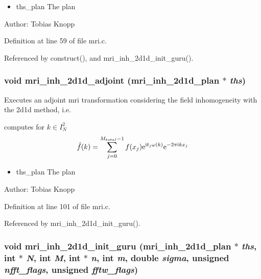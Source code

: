 \begin{itemize}
\item ths\_\-plan The plan\end{itemize}
\begin{Desc}
\item[Author:]Tobias Knopp \end{Desc}


Definition at line 59 of file mri.c.

Referenced by construct(), and mri\_\-inh\_\-2d1d\_\-init\_\-guru().\hypertarget{group__mri_ge431fe3e0ef4dc056f58d827f804d0a4}{
\subsubsection{\setlength{\rightskip}{0pt plus 5cm}void mri\_\-inh\_\-2d1d\_\-adjoint ({\bf mri\_\-inh\_\-2d1d\_\-plan} $\ast$ {\em ths})}}
\label{group__mri_ge431fe3e0ef4dc056f58d827f804d0a4}


Executes an adjoint mri transformation considering the field inhomogeneity with the 2d1d method, i.e. 

computes for $k \in I_N^2$ \[ \hat{f}(k) = \sum_{j=0}^{M_{total}-1} f(x_j) {\rm e}^{\mbox{\rm\scriptsize i} t_j \omega(k)} {\rm e}^{-2 \pi \mbox{\rm\scriptsize i} k x_j} \]

\begin{itemize}
\item ths\_\-plan The plan\end{itemize}
\begin{Desc}
\item[Author:]Tobias Knopp \end{Desc}


Definition at line 101 of file mri.c.

Referenced by mri\_\-inh\_\-2d1d\_\-init\_\-guru().\hypertarget{group__mri_g8010f0f3bd86f3bd6516751b876e6b14}{
\subsubsection{\setlength{\rightskip}{0pt plus 5cm}void mri\_\-inh\_\-2d1d\_\-init\_\-guru ({\bf mri\_\-inh\_\-2d1d\_\-plan} $\ast$ {\em ths}, int $\ast$ {\em N}, int {\em M}, int $\ast$ {\em n}, int {\em m}, double {\em sigma}, unsigned {\em nfft\_\-flags}, unsigned {\em fftw\_\-flags})}}
\label{group__mri_g8010f0f3bd86f3bd6516751b876e6b14}


